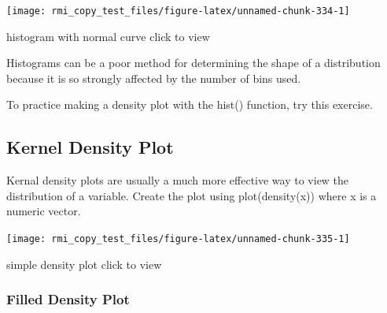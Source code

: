 \documentclass[]{book}
\newenvironment{Shaded}{\begin{snugshade}}{\end{snugshade}}
\newcommand{\CommentTok}[1]{\textcolor[rgb]{0.56,0.35,0.01}{\textit{#1}}}
\newcommand{\DataTypeTok}[1]{\textcolor[rgb]{0.13,0.29,0.53}{#1}}
\newcommand{\KeywordTok}[1]{\textcolor[rgb]{0.13,0.29,0.53}{\textbf{#1}}}
\newcommand{\NormalTok}[1]{#1}
\newcommand{\OperatorTok}[1]{\textcolor[rgb]{0.81,0.36,0.00}{\textbf{#1}}}
\newcommand{\StringTok}[1]{\textcolor[rgb]{0.31,0.60,0.02}{#1}}
\theoremstyle{definition}
\theoremstyle{definition}
\theoremstyle{definition}
\theoremstyle{remark}
\begin{document}
\begin{center}\texttt{[image: rmi\_copy\_test\_files/figure-latex/unnamed-chunk-334-1]} \end{center}

histogram with normal curve click to view

Histograms can be a poor method for determining the shape of a
distribution because it is so strongly affected by the number of bins
used.

To practice making a density plot with the hist() function, try this
exercise.

\hypertarget{kernel-density-plot}{%
\subsection{Kernel Density Plot}\label{kernel-density-plot}}

Kernal density plots are usually a much more effective way to view the
distribution of a variable. Create the plot using plot(density(x)) where
x is a numeric vector.

\begin{Shaded}
\end{Shaded}

\begin{center}\texttt{[image: rmi\_copy\_test\_files/figure-latex/unnamed-chunk-335-1]} \end{center}

simple density plot click to view

\hypertarget{filled-density-plot}{%
\subsubsection{Filled Density Plot}\label{filled-density-plot}}

\begin{Shaded}
\end{Shaded}
\end{document}
